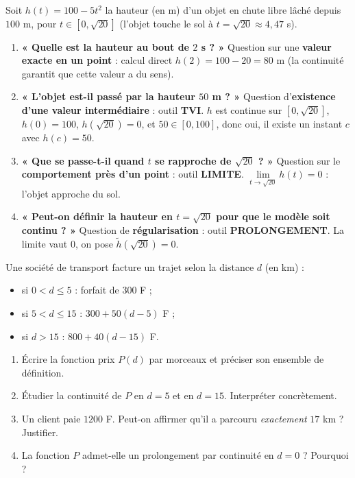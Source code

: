 \documentclass[11pt]{article}
\newcounter{popsec}
\newcounter{popsub}
\newcommand{\courssub}[1]{%
  \stepcounter{popsub}%
  \par\vspace{9pt}\noindent{\popxbold\fontsize{11.5}{13}\selectfont\color{popink}{\color{poporange}\thepopsec.\thepopsub}\hspace{6pt}#1}\par\nopagebreak\vspace{4pt}
}
\begin{document}
\begin{exemplebox}
Soit $h(t)=100-5t^2$ la hauteur (en m) d'un objet en chute libre lâché depuis $100$ m, pour $t\in[0,\sqrt{20}]$ (l'objet touche le sol à $t=\sqrt{20}\approx 4,47$ s).
\begin{enumerate}
\item \textbf{« Quelle est la hauteur au bout de $2$ s ? »} Question sur une \textbf{valeur exacte en un point} : calcul direct $h(2)=100-20=80$ m (la continuité garantit que cette valeur a du sens).
\item \textbf{« L'objet est-il passé par la hauteur $50$ m ? »} Question d'\textbf{existence d'une valeur intermédiaire} : outil \textbf{TVI}. $h$ est continue sur $[0,\sqrt{20}]$, $h(0)=100$, $h(\sqrt{20})=0$, et $50\in[0,100]$, donc oui, il existe un instant $c$ avec $h(c)=50$.
\item \textbf{« Que se passe-t-il quand $t$ se rapproche de $\sqrt{20}$ ? »} Question sur le \textbf{comportement près d'un point} : outil \textbf{LIMITE}. $\lim\limits_{t\to\sqrt{20}}h(t)=0$ : l'objet approche du sol.
\item \textbf{« Peut-on définir la hauteur en $t=\sqrt{20}$ pour que le modèle soit continu ? »} Question de \textbf{régularisation} : outil \textbf{PROLONGEMENT}. La limite vaut $0$, on pose $\tilde h(\sqrt{20})=0$.
\end{enumerate}
\end{exemplebox}

\courssub{Exercices de synthèse}

\begin{exercice}
Une société de transport facture un trajet selon la distance $d$ (en km) :
\begin{itemize}
\item si $0<d\le 5$ : forfait de $300$ F ;
\item si $5<d\le 15$ : $300 + 50(d-5)$ F ;
\item si $d>15$ : $800 + 40(d-15)$ F.
\end{itemize}
\begin{enumerate}
\item Écrire la fonction prix $P(d)$ par morceaux et préciser son ensemble de définition.
\item Étudier la continuité de $P$ en $d=5$ et en $d=15$. Interpréter concrètement.
\item Un client paie $1200$ F. Peut-on affirmer qu'il a parcouru \emph{exactement} $17$ km ? Justifier.
\item La fonction $P$ admet-elle un prolongement par continuité en $d=0$ ? Pourquoi ?
\end{enumerate}
\end{exercice}
\end{document}
